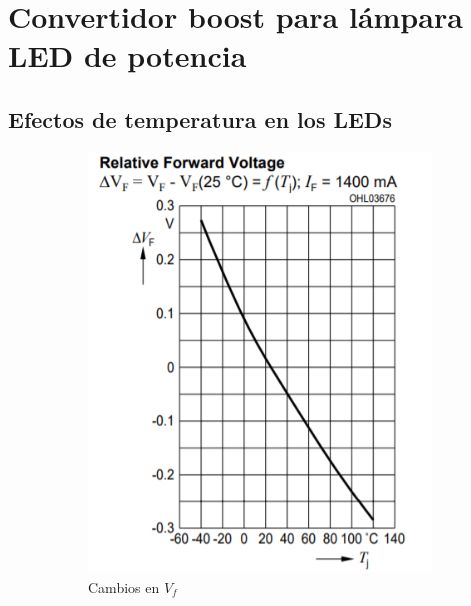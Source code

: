 \documentclass[e4-tp2-main.tex]{subfiles}
\begin{document}
\section{Convertidor boost para l\'ampara LED de potencia}

\subsection{Efectos de temperatura en los LEDs}

\begin{figure}
    \centering
    \begin{subfigure}[t]{0.24\textwidth}
    	\includegraphics[width=\textwidth]{images/ej2/Cambio_Vf_LED.png}
    	\caption{Cambios en $V_f$}
    \end{subfigure}
    \begin{subfigure}[t]{0.24\textwidth}

\end{subfigure}
\end{figure}
\end{document}
